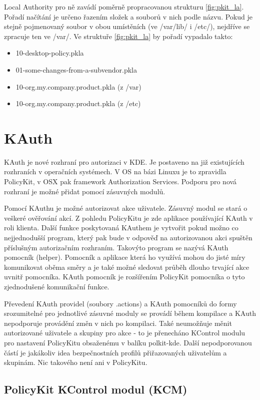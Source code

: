 Local Authority pro ně zavádí poměrně propracovanou strukturu \ref{fig:pkit_la}.
Pořadí načítání je určeno řazením složek a souborů v nich podle názvu. Pokud je
stejně pojmenovaný soubor v obou umístěních (ve /var/lib/ i /etc/), nejdříve se
zpracuje ten ve /var/.
Ve struktuře \ref{fig:pkit_la} by pořadí vypadalo takto:
\begin{itemize}
\item 10-desktop-policy.pkla
\item 01-some-changes-from-a-subvendor.pkla
\item 10-org.my.company.product.pkla (z /var)
\item 10-org.my.company.product.pkla (z /etc)
\end{itemize}

\section{KAuth}
KAuth je nové rozhraní pro autorizaci v KDE. Je postaveno na již existujících 
rozhraních v operačních systémech. V OS na bázi Linuxu je to zpravidla
PolicyKit, v OSX pak framework Authorization Services. Podporu pro nová
rozhraní je možné přidat pomocí zásuvných modulů.

Pomocí KAuthu je možné autorizovat akce uživatele. Zásuvný modul se stará
o veškeré ověřování akcí. Z pohledu PolicyKitu je zde aplikace používající
KAuth v roli klienta.
Další funkce poskytovaná KAuthem je vytvořit pokud možno co nejjednodušší
program, který pak bude v odpověď na autorizovanou akci spuštěn příslušným
autorizačním rozhraním. Takovýto program se nazývá KAuth pomocník (helper).
Pomocník a aplikace která ho využívá mohou do jisté míry komunikovat oběma směry
a je také možné sledovat průběh dlouho trvající akce uvnitř pomocníka. KAuth
pomocník je rozšířením PolicyKit pomocníka o tyto zjednodušené komunikační
funkce.

Převedení KAuth providel (soubory .actions) a KAuth pomocníků do formy
srozumitelné pro jednotlivé zásuvné moduly se provádí během kompilace a KAuth
nepodporuje provádění změn v nich po kompilaci. Také neumožňuje měnit
autorizované uživatele a skupiny pro akce - to je přenecháno KControl modulu
pro nastavení PolicyKitu obsaženému v balíku polkit-kde. Další nepodporovanou
částí je jakákoliv idea bezpečnostních profilů přiřazovaných uživatelům
a skupinám. Nic takového není ani v PolicyKitu.

\subsection{PolicyKit KControl modul (KCM)}
